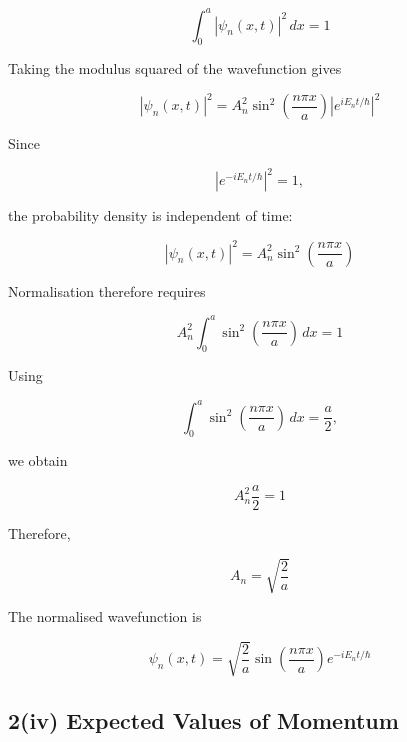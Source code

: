 \documentclass{article}
\begin{document}
\begin{equation*}
\int_0^a |\psi_n(x,t)|^2\,dx=1
\end{equation*}

Taking the modulus squared of the wavefunction gives

\begin{equation*}
|\psi_n(x,t)|^2 = A_n^2 \sin^2\left(\frac{n\pi x}{a}\right) \left|e^{ iE_nt/\hbar}\right|^2
\end{equation*}

Since

\begin{equation*}
\left|e^{-iE_nt/\hbar}\right|^2 = 1,
\end{equation*}

the probability density is independent of time:

\begin{equation*}
|\psi_n(x,t)|^2 = A_n^2 \sin^2\left(\frac{n\pi x}{a}\right)
\end{equation*}

Normalisation therefore requires

\begin{equation*}
A_n^2 \int_0^a \sin^2\left(\frac{n\pi x}{a}\right)\,dx = 1
\end{equation*}

Using

\begin{equation*}
\int_0^a \sin^2\left(\frac{n\pi x}{a}\right)\,dx = \frac{a}{2},
\end{equation*}

we obtain

\begin{equation*}
A_n^2\frac{a}{2}=1
\end{equation*}

Therefore,

\begin{equation*}
\boxed{A_n=\sqrt{\frac{2}{a}}}
\end{equation*}

The normalised wavefunction is

\begin{equation*}
\boxed{\psi_n(x,t) = \sqrt{\frac{2}{a}} \sin\left(\frac{n\pi x}{a}\right) e^{-iE_nt/\hbar}}
\end{equation*}


\subsection*{2(iv) Expected Values of Momentum}
\end{document}
